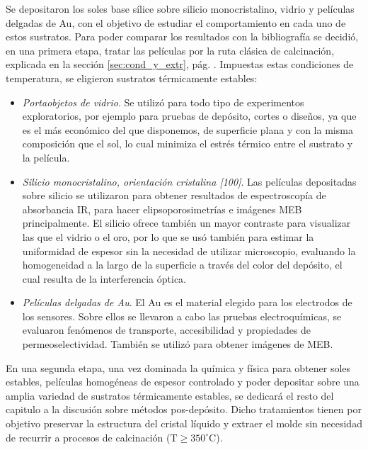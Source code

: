 	Se depositaron los soles base sílice sobre silicio monocristalino, vidrio y películas delgadas de Au, con el objetivo de estudiar el comportamiento en cada uno de estos sustratos. Para poder comparar los resultados con la bibliografía\cite{Soler-Illia2006,Brinker1990} se decidió, en una primera etapa, tratar las películas por la ruta clásica de calcinación, explicada en la sección \ref{sec:cond_y_extr}, pág. \pageref{sec:cond_y_extr}. Impuestas estas condiciones de temperatura, se eligieron sustratos térmicamente estables:

		\begin{itemize}

			\item \textit{Portaobjetos de vidrio}. Se utilizó para todo tipo de experimentos exploratorios, por ejemplo para pruebas de depósito, cortes o diseños, ya que es el más económico del que disponemos, de superficie plana y con la misma composición que el sol, lo cual minimiza el estrés térmico entre el sustrato y la película.

			\item \textit{Silicio monocristalino, orientación cristalina [100]}. Las películas depositadas sobre silicio se utilizaron para obtener resultados de espectroscopía de absorbancia IR, para hacer elipsoporosimetrías e imágenes MEB principalmente. El silicio ofrece también un mayor contraste para visualizar las \pdm\space que el vidrio o el oro, por lo que se usó también para estimar la uniformidad de espesor sin la necesidad de utilizar microscopio, evaluando la homogeneidad a la largo de la superficie a través del color del depósito, el cual resulta de la interferencia óptica.
		
			\item \textit{Películas delgadas de Au}. El Au es el material elegido para los electrodos de los sensores. Sobre ellos se llevaron a cabo las pruebas electroquímicas, se evaluaron fenómenos de transporte, accesibilidad y propiedades de permeoselectividad. También se utilizó para obtener imágenes de MEB. 

			\end{itemize}
	
	En una segunda etapa, una vez dominada la química y física para obtener soles estables, películas homogéneas de espesor controlado y poder depositar sobre una amplia variedad de sustratos térmicamente estables, se dedicará el resto del capitulo a la discusión sobre métodos pos-depósito. Dicho tratamientos tienen por objetivo preservar la estructura del cristal líquido y extraer el molde sin necesidad de recurrir a procesos de calcinación ($\text{T} \geq 350^\circ \text{C}$).

